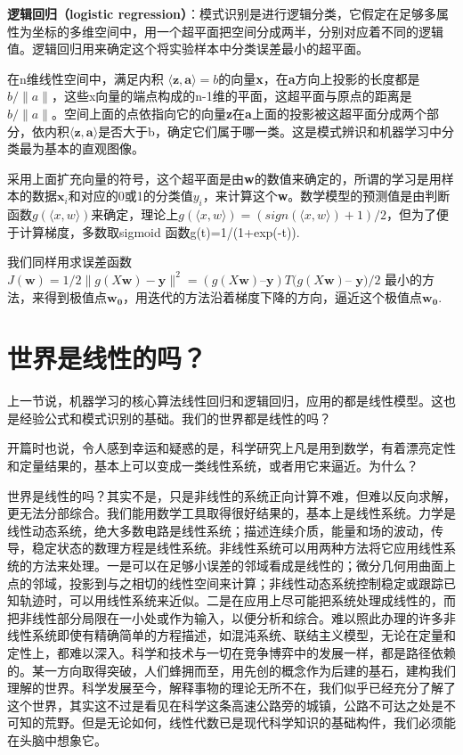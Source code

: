 \textbf{逻辑回归（logistic regression）}：模式识别是进行逻辑分类，它假定在足够多属性为坐标的多维空间中，用一个超平面把空间分成两半，分别对应着不同的逻辑值。逻辑回归用来确定这个将实验样本中分类误差最小的超平面。

在n维线性空间中，满足内积 $ \langle \mathbf{z}, \mathbf{a}\rangle = b $的向量\textbf{x}，在\textbf{a}方向上投影的长度都是$ b/\|a\| $，这些x向量的端点构成的n-1维的平面，这超平面与原点的距离是$ b/\|a\| $。空间上面的点依指向它的向量\textbf{z}在\textbf{a}上面的投影被这超平面分成两个部分，依内积$ \langle \mathbf{z}, \mathbf{a}\rangle  $是否大于b，确定它们属于哪一类。这是模式辨识和机器学习中分类最为基本的直观图像。

采用上面扩充向量的符号，这个超平面是由\textbf{w}的数值来确定的，所谓的学习是用样本的数据$ \mathbf{x}_i $和对应的0或1的分类值$ y_i $，来计算这个\textbf{w}。数学模型的预测值是由判断函数$ g(\langle x,w \rangle ) $来确定，理论上$ g(\langle x,w \rangle )= (sign(\langle x,w \rangle)+1)/2 $，但为了便于计算梯度，多数取sigmoid 函数g(t)=1/(1+exp(-t)).

我们同样用求误差函数$ J(\mathbf{w}) =1/2\|g(X\mathbf{w}) - \mathbf{y}\|^2 = (g( X\mathbf{w}) –\mathbf{y})T (g( X\mathbf{w}) –$   $\mathbf{y})/2 $ 最小的方法，来得到极值点$ \mathbf{w_0} $，用迭代的方法沿着梯度下降的方向，逼近这个极值点$ \mathbf{w_0} $.

\section{世界是线性的吗？}

上一节说，机器学习的核心算法线性回归和逻辑回归，应用的都是线性模型。这也是经验公式和模式识别的基础。我们的世界都是线性的吗？

开篇时也说，令人感到幸运和疑惑的是，科学研究上凡是用到数学，有着漂亮定性和定量结果的，基本上可以变成一类线性系统，或者用它来逼近。为什么？

世界是线性的吗？其实不是，只是非线性的系统正向计算不难，但难以反向求解，更无法分部综合。我们能用数学工具取得很好结果的，基本上是线性系统。力学是线性动态系统，绝大多数电路是线性系统；描述连续介质，能量和场的波动，传导，稳定状态的数理方程是线性系统。非线性系统可以用两种方法将它应用线性系统的方法来处理。一是可以在足够小误差的邻域看成是线性的；微分几何用曲面上点的邻域，投影到与之相切的线性空间来计算；非线性动态系统控制稳定或跟踪已知轨迹时，可以用线性系统来近似。二是在应用上尽可能把系统处理成线性的，而把非线性部分局限在一小处或作为输入，以便分析和综合。难以照此办理的许多非线性系统即使有精确简单的方程描述，如混沌系统、联结主义模型，无论在定量和定性上，都难以深入。科学和技术与一切在竞争博弈中的发展一样，都是路径依赖的。某一方向取得突破，人们蜂拥而至，用先创的概念作为后建的基石，建构我们理解的世界。科学发展至今，解释事物的理论无所不在，我们似乎已经充分了解了这个世界，其实这不过是看见在科学这条高速公路旁的城镇，公路不可达之处是不可知的荒野。但是无论如何，线性代数已是现代科学知识的基础构件，我们必须能在头脑中想象它。

